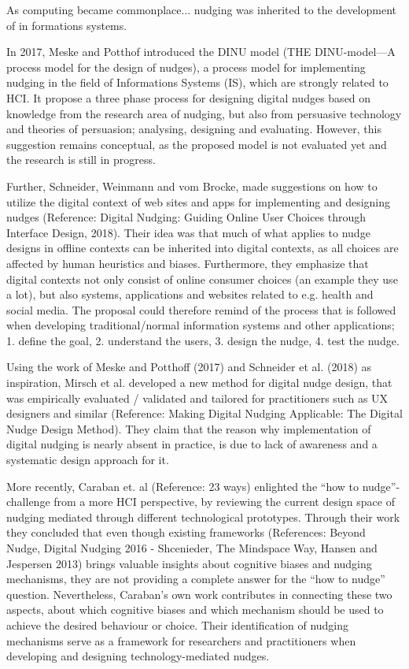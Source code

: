 {As computing became commonplace... nudging was inherited to the development of in formations systems. 

In 2017, Meske and Potthof introduced the DINU model (THE DINU-model—A process model for the design of nudges), a process model for implementing nudging in the field of Informations Systems (IS), which are strongly related to HCI. It propose a three phase process for designing digital nudges based on knowledge from the research area of nudging, but also from persuasive technology and theories of persuasion; analysing, designing and evaluating. However, this suggestion remains conceptual, as the proposed model is not evaluated yet and the research is still in progress.

Further, Schneider, Weinmann and vom Brocke, made suggestions on how to utilize the digital context of web sites and apps for implementing and designing nudges (Reference: Digital Nudging: Guiding Online User Choices through Interface Design, 2018). Their idea was that much of what applies to nudge designs in offline contexts can be inherited into digital contexts, as all choices are affected by human heuristics and biases. Furthermore, they emphasize that digital contexts not only consist of online consumer choices (an example they use a lot), but also systems, applications and websites related to e.g. health and social media. The proposal could therefore remind of the process that is followed when developing traditional/normal information systems and other applications; 1. define  the  goal, 2. understand  the  users, 3. design  the  nudge,  4. test  the  nudge. 

Using the work of Meske and Potthoff (2017) and Schneider et al. (2018) as inspiration, Mirsch et al. developed a new method for digital nudge design, that was empirically evaluated / validated and tailored for practitioners such as UX designers and similar (Reference: Making Digital Nudging Applicable: The Digital Nudge Design Method). They claim that the reason why implementation of digital nudging is nearly absent in practice, is due to lack of awareness and a systematic design approach for it.

More recently, Caraban et. al (Reference: 23 ways) enlighted the “how to nudge”-challenge from a more HCI perspective, by reviewing the current design space of nudging mediated through different technological prototypes. Through their work they concluded that even though existing frameworks (References: Beyond Nudge, Digital Nudging 2016 - Shcenieder, The Mindspace Way, Hansen and Jespersen 2013) brings valuable insights about cognitive biases and nudging mechanisms, they are not providing a complete answer for the “how to nudge” question. Nevertheless, Caraban’s own work contributes in connecting these two aspects, about which cognitive biases and which mechanism should be used to achieve the desired behaviour or choice. Their identification of nudging mechanisms serve as a framework for researchers and practitioners when developing and designing technology-mediated nudges. %

}
